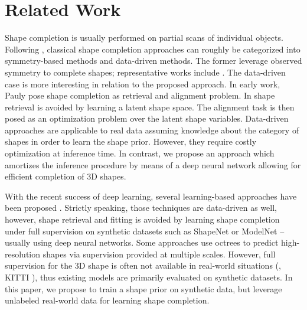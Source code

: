 \section{Related Work}
\label{sec:related-work}

%
Shape completion is usually performed on partial scans of individual objects. Following \cite{SungTG2015}, classical shape completion approaches can roughly be categorized into symmetry-based methods and data-driven methods. The former leverage observed symmetry to complete shapes; representative works include \cite{ThrunICCV2005,PaulyTG2008,ZhengTG2010,KroemerHUMANOIDS2012,LawCVIU2011}.
The data-driven case is more interesting in relation to the proposed approach.
In early work, Pauly \etal \cite{Pauly2005SGP} pose shape completion as retrieval and alignment problem.
In \cite{LiCGF2015,Engelmann2016GCPR,Engelmann2017WACV,Nan2012TG,Bao2013CVPR,Dame2013CVPR,Gupta2015CVPR} shape retrieval is avoided by learning a latent shape space.
The alignment task is then posed as an optimization problem over the latent shape variables.
Data-driven approaches are applicable to real data assuming knowledge about the category of shapes in order to learn the shape prior.
However, they require costly optimization at inference time. In contrast, we propose an approach which amortizes the inference procedure by means of a deep neural network allowing for efficient completion of 3D shapes.


%
With the recent success of deep learning, several learning-based approaches have been proposed \cite{Firman2016CVPR,SmithARXIV2017,Dai2016ARXIV,Sharma2016ARXIV,Rezende2016ARXIV,Fan2016ARXIV,Riegler2017THREEDV,Han2017ICCV}. Strictly speaking, those techniques are data-driven as well, however, shape retrieval and fitting is avoided by learning shape completion under full supervision on synthetic datasets such as ShapeNet \cite{Chang2015ARXIV} or ModelNet \cite{Wu2015CVPR} -- usually using deep neural networks.
Some approaches \cite{Riegler2017THREEDV,Haene2017ARXIV,Tatarchenko2017ICCV} use octrees to predict high-resolution shapes via supervision provided at multiple scales.
However, full supervision for the 3D shape is often not available in real-world situations (\eg, KITTI \cite{Geiger2012CVPR}), thus existing models are primarily evaluated on synthetic datasets.
In this paper, we propose to train a shape prior on synthetic data, but leverage unlabeled real-world data for learning shape completion. %

